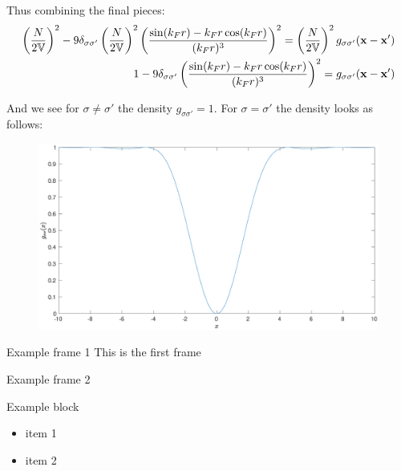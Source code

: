 \documentclass{beamer}
\newcommand{\V}{\mathbb{V}}
\begin{document}
\begin{frame}
Thus combining the final pieces:
\begin{align*}
\left(\frac{N}{2\V}\right)^2 -9\delta_{\sigma\sigma'}\left(\frac{N}{2\V}\right)^2 \left( \frac{\sin(k_Fr) - k_Fr \cos(k_Fr)}{(k_Fr)^3}\right)^2 = \left(\frac{N}{2\V}\right)^2 g_{\sigma\sigma'}(\x-\x') \\
1 -9\delta_{\sigma\sigma'} \left( \frac{\sin(k_Fr) - k_Fr \cos(k_Fr)}{(k_Fr)^3}\right)^2 =  g_{\sigma\sigma'}(\x-\x')
\end{align*}

And we see for $\sigma \neq \sigma'$ the density $g_{\sigma\sigma'}=1$.
For $\sigma = \sigma'$ the density looks as follows:

\begin{figure}[H]
\centering
\includegraphics[width=\textwidth]{Density}
\end{figure}
\end{frame}

\begin{frame}{Example frame 1}
This is the first frame
\end{frame}

\begin{frame}{Example frame 2}
\begin{block}{Example block}
\begin{itemize}
\item item 1
\item item 2
\end{itemize}
\end{block}
\end{frame}
\end{document}

